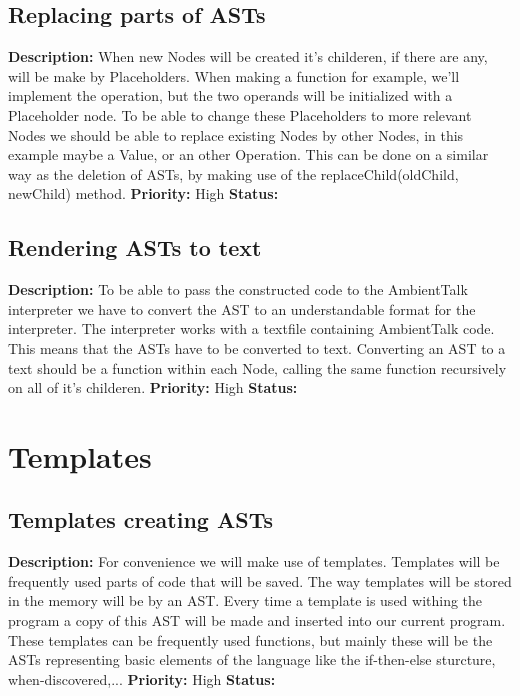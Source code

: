 \documentclass{article}
\begin{document}
\subsection{Replacing parts of ASTs}
\textbf{Description: }When new Nodes will be created it's childeren, if there are any, will be make by Placeholders. When making a function for example, we'll implement the operation,
but the two operands will be initialized with a Placeholder node. To be able to change these Placeholders to more relevant Nodes we should be able to 
replace existing Nodes by other Nodes, in this example maybe a Value, or an other Operation. This can be done on a similar way as the deletion of ASTs, by making use of the replaceChild(oldChild, newChild) method.\newline
\textbf{Priority:} High \newline
\textbf{Status: } \newline
\subsection{Rendering ASTs to text}
\textbf{Description: } To be able to pass the constructed code to the AmbientTalk interpreter we have to convert the AST to an understandable format for the interpreter. The 
interpreter works with a textfile containing AmbientTalk code. This means that the ASTs have to be converted to text. Converting an
AST to a text should be a function within each Node, calling the same function recursively on all of it's childeren.\newline
\textbf{Priority:} High \newline
\textbf{Status: } \newline
\section{Templates} 
\subsection{Templates creating ASTs}
\textbf{Description: } For convenience we will make use of templates. Templates will be frequently used parts of code that will be saved. The way templates will be stored in the 
memory will be by an AST. Every time a template is used withing the program a copy of this AST will be made and inserted into our current program.
These templates can be frequently used functions, but mainly these will be the ASTs representing basic elements of the language like the if-then-else sturcture, when-discovered,...\newline
\textbf{Priority:} High \newline
\textbf{Status: } \newline
\end{document}

